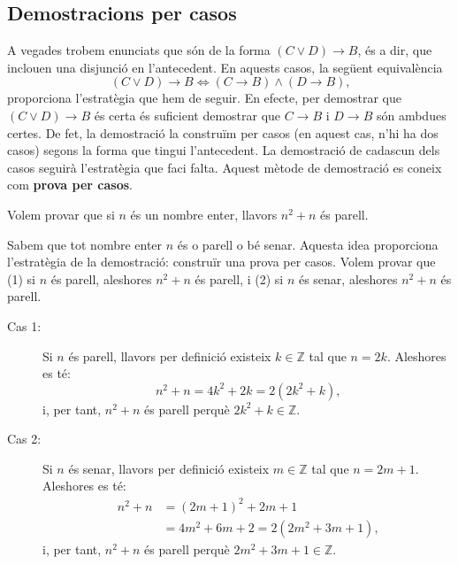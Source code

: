 \subsection{Demostracions per casos}

A vegades trobem enunciats que són de la forma $\left( C\vee D\right)
\longrightarrow B$, és a dir, que inclouen una disjunció en
l'antecedent. En aquests casos, la següent equivalència
\begin{equation*}
\left( C\vee D\right) \longrightarrow B\Longleftrightarrow\left(
C\longrightarrow B\right) \wedge\left( D\longrightarrow B\right) \text{,}
\end{equation*}
proporciona l'estratègia que hem de seguir. En efecte, per demostrar que
$\left( C\vee D\right) \longrightarrow B$ és certa és suficient
demostrar que $C\longrightarrow B$ i $D\longrightarrow B$ són ambdues
certes. De fet, la demostració la construïm per casos (en aquest
cas, n'hi ha dos casos) segons la forma que tingui l'antecedent. La
demostració de cadascun dels casos seguirà l'estratègia que faci
falta. Aquest mètode de demostració es coneix com \textbf{prova per
casos}.

\begin{exemple}
Volem provar que si $n$ és un nombre enter, llavors $n^{2}+n$ és
parell.
\end{exemple}

\begin{solucio}
Sabem que tot nombre enter $n$ és o parell o bé senar. Aquesta idea
proporciona l'estratègia de la demostració: construïr una prova
per casos. Volem provar que (1) si $n$ és parell, aleshores $n^{2}+n$
és parell, i (2) si $n$ és senar, aleshores $n^{2}+n$ és parell.

\begin{description}
\item[Cas 1:] Si $n$ és parell, llavors per definició existeix $k\in\mathbb{Z}$ tal que $n=2k$. Aleshores es té:
\begin{equation*}
n^{2}+n=4k^{2}+2k=2\left( 2k^{2}+k\right) \text{,}
\end{equation*}
i, per tant, $n^{2}+n$ és parell perquè $2k^{2}+k\in\mathbb{Z}$.

\item[Cas 2:] Si $n$ és senar, llavors per definició existeix $m\in\mathbb{Z}$ tal que $n=2m+1$. Aleshores es té:\begin{align*}
n^{2}+n & =\left( 2m+1\right) ^{2}+2m+1 \\
& =4m^{2}+6m+2=2\left( 2m^{2}+3m+1\right) \text{,}
\end{align*}
i, per tant, $n^{2}+n$ és parell perquè $2m^{2}+3m+1\in\mathbb{Z}$.
\end{description}
\end{solucio}

